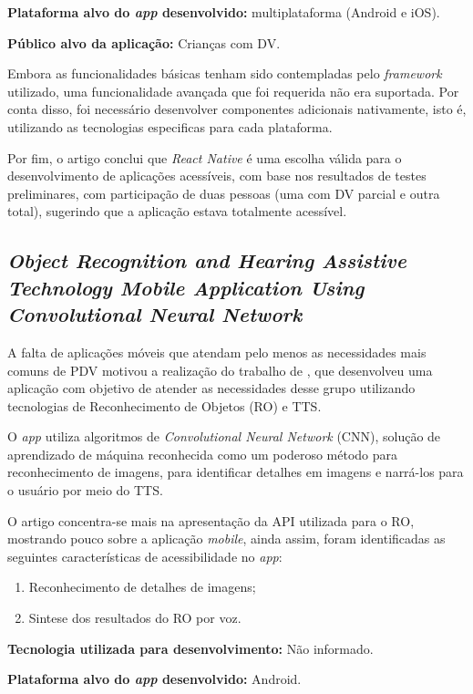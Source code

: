 \textbf{Plataforma alvo do \emph{app} desenvolvido:} multiplataforma (Android e iOS).

\textbf{Público alvo da aplicação:} Crianças com DV\@.

Embora as funcionalidades básicas tenham sido contempladas pelo \emph{framework} utilizado, uma funcionalidade avançada que foi requerida não era suportada.
Por conta disso, foi necessário desenvolver componentes adicionais nativamente, isto é, utilizando as tecnologias especificas para cada plataforma.

Por fim, o artigo conclui que \emph{React Native} é uma escolha válida para o desenvolvimento de aplicações acessíveis,
com base nos resultados de testes preliminares, com participação de duas pessoas (uma com DV parcial e outra total), sugerindo que a aplicação estava totalmente acessível.

\subsection{\emph{Object Recognition and Hearing Assistive Technology Mobile Application Using Convolutional Neural Network}}

A falta de aplicações móveis que atendam pelo menos as necessidades mais comuns de PDV motivou a realização do trabalho de , que desenvolveu
uma aplicação com objetivo de atender as necessidades desse grupo utilizando tecnologias de Reconhecimento de Objetos (RO) e TTS\@.

O \emph{app} utiliza algoritmos de \emph{Convolutional Neural Network} (CNN), solução de aprendizado de máquina reconhecida como um poderoso método para reconhecimento de
imagens, para identificar detalhes em imagens e narrá\@-los para o usuário por meio do TTS\@.

O artigo concentra-se mais na apresentação da API utilizada para o RO, mostrando pouco sobre a aplicação \emph{mobile},
ainda assim, foram identificadas as seguintes características de acessibilidade no \emph{app}:

\begin{enumerate}
    \item Reconhecimento de detalhes de imagens;
    \item Sintese dos resultados do RO por voz.
\end{enumerate}

\textbf{Tecnologia utilizada para desenvolvimento:} Não informado.

\textbf{Plataforma alvo do \emph{app} desenvolvido:} Android.

